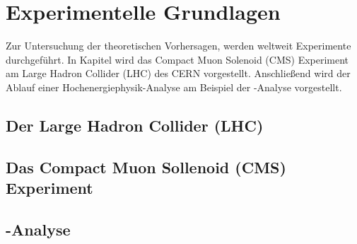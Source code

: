 \chapter{Experimentelle Grundlagen}
\label{ch:experiment}

{}	%

Zur Untersuchung der theoretischen Vorhersagen, werden weltweit Experimente durchgef\"uhrt. In Kapitel \cite{ch:Experiment} wird das Compact Muon Solenoid (CMS) Experiment am Large Hadron Collider (LHC) des CERN vorgestellt. Anschlie\ss end wird der Ablauf einer Hochenergiephysik-Analyse am Beispiel der \ttH-Analyse vorgestellt.

\section{Der Large Hadron Collider (LHC)}
\label{ch:Experiment:sec:LHC}

\section{Das Compact Muon Sollenoid (CMS) Experiment}
\label{ch:Experiment:sec:CMS}

\section{\ttH-Analyse}
\label{ch:Experiment:sec:ttH}

